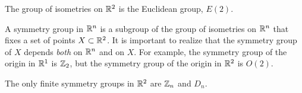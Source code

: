  
\begin{theorem}
The group of isometries on ${\Bbb R}^2$ is the Euclidean group,
$E(2)$. 
\end{theorem}
 
 
A {\bfi symmetry group\/} in ${\Bbb R}^n$ is a
subgroup of the group of isometries on ${\Bbb R}^n$ that fixes a set
of points $X \subset {\Bbb R}^2$.  It is important to realize that the
symmetry group of $X$ depends {\em both\/} on ${\Bbb R}^n$ and on
$X$. For example, the symmetry group of the origin in ${\Bbb R}^1$ is
${\Bbb Z}_2$, but the symmetry group of the origin in ${\Bbb R}^2$ is
$O(2)$. 
 
 
\begin{theorem}
The only finite symmetry groups in ${\Bbb R}^2$ are ${\Bbb Z}_n$ and
$D_n$. 
\end{theorem}
 
